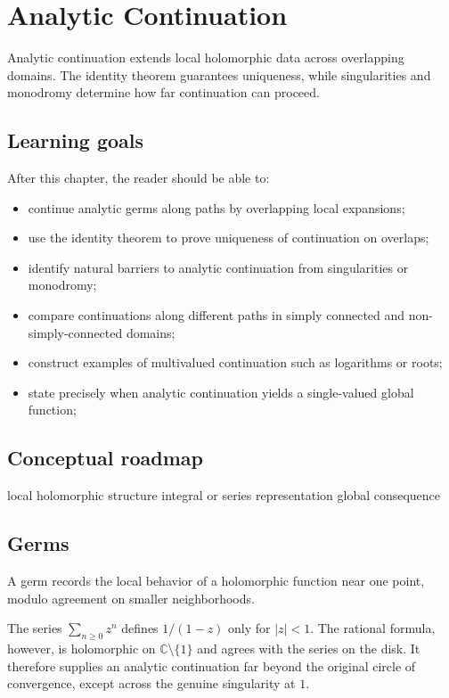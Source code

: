 \chapter{Analytic Continuation}
\label{ch:iv15}

Analytic continuation extends local holomorphic data across overlapping domains. The identity theorem guarantees uniqueness, while singularities and monodromy determine how far continuation can proceed.

\section*{Learning goals}
After this chapter, the reader should be able to:
\begin{itemize}
\item continue analytic germs along paths by overlapping local expansions;
\item use the identity theorem to prove uniqueness of continuation on overlaps;
\item identify natural barriers to analytic continuation from singularities or monodromy;
\item compare continuations along different paths in simply connected and non-simply-connected domains;
\item construct examples of multivalued continuation such as logarithms or roots;
\item state precisely when analytic continuation yields a single-valued global function;
\end{itemize}
\section*{Conceptual roadmap}
\volroadmap
  {local holomorphic structure}
  {integral or series representation}
  {global consequence}

\section{Germs}
A germ records the local behavior of a holomorphic function near one point, modulo agreement on smaller neighborhoods.

\begin{example}\label{ex:iv15-expand-01}
The series \(\sum_{n\ge0}z^n\) defines \(1/(1-z)\) only for \(|z|<1\). The rational formula, however, is holomorphic on \(\mathbb C\setminus\{1\}\) and agrees with the series on the disk. It therefore supplies an analytic continuation far beyond the original circle of convergence, except across the genuine singularity at \(1\).
\end{example}

